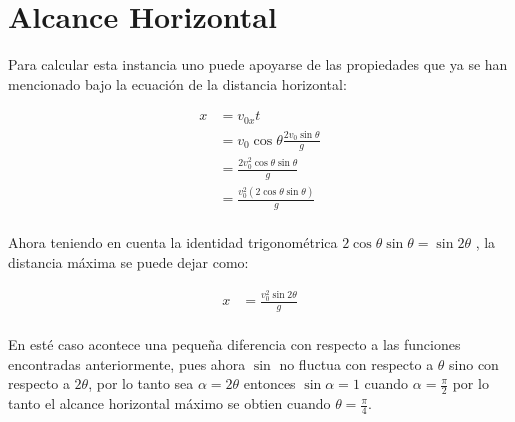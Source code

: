 \section{Alcance Horizontal}
\label{sec:alcance_horizontal}


 Para calcular esta instancia uno puede apoyarse de las propiedades que ya se
 han mencionado bajo la ecuación de la distancia horizontal:

 \begin{align*}
     x &=  v_{0x}t \\
     &= v_{0}\cos\theta \frac{2v_{0}\sin\theta}{g}\\
     &= \frac{2v_{0}^{2}\cos\theta \sin\theta}{g} \\
     &= \frac{v_{0}^{2}\left(2\cos\theta \sin\theta\right) }{g} \\
 \end{align*}

 Ahora teniendo en cuenta la identidad trigonométrica \(2\cos\theta \sin\theta
 = \sin 2\theta \) \cite{Weisstein}, la distancia máxima se puede dejar como:

 \begin{align*}
     x &= \frac{v_{0}^{2}\sin 2\theta }{g} \\
 \end{align*}

 En esté caso acontece una pequeña diferencia con respecto a las funciones
 encontradas anteriormente,  pues ahora \(\sin\) no fluctua con respecto a
 \(\theta\) sino con respecto a \(2\theta\), por lo tanto sea \(\alpha =
 2\theta\) entonces \(\sin\alpha = 1\) cuando \(\alpha  = \frac{\pi}{2}\) por
 lo tanto el alcance horizontal máximo se obtien cuando \(\theta =
 \frac{\pi}{4}\).



























